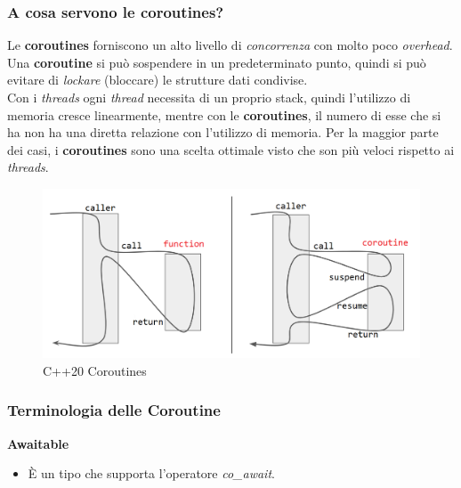 \subsubsection{A cosa servono le coroutines?}

\textsf{\small  Le \textbf{coroutines} forniscono un alto livello di \emph{concorrenza} con molto poco \emph{overhead}.} \\

\textsf{\small Una \textbf{coroutine} si può sospendere in un predeterminato punto, quindi si può evitare di \emph{lockare} (bloccare) le strutture dati condivise.} \\

\textsf{\small Con i \emph{threads} ogni \emph{thread} necessita di un proprio stack, quindi l'utilizzo di memoria cresce linearmente, mentre con le \textbf{coroutines}, il numero di esse che si ha non ha una diretta relazione con l'utilizzo di memoria. Per la maggior parte dei casi, i \textbf{coroutines} sono una scelta ottimale visto che son più veloci rispetto ai \emph{threads}. } \\

\begin{figure}[H]
	\centering
	\includegraphics[width=1\textwidth, height=1\textheight, keepaspectratio]{./imgs/C++20-Coroutine.png}
	\caption{C++20 Coroutines}
	\label{fig:coroutines}
\end{figure}

\subsubsection{Terminologia delle Coroutine}

\textsf{\small \textbf{Awaitable}} \\

\begin{itemize}
	\item \textsf{\small È un tipo che supporta l'operatore \emph{co\_await}.}
\end{itemize}

